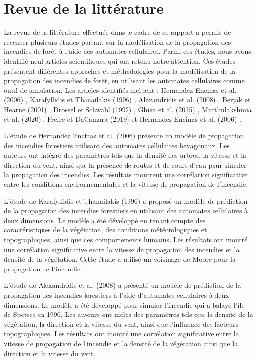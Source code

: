 \section{Revue de la littérature }

La revue de la littérature effectuée dans le cadre de ce rapport a permis de recenser plusieurs études portant sur la modélisation de la propagation des incendies de forêt à l'aide des automates cellulaires. Parmi ces études, nous avons identifié neuf articles scientifiques qui ont retenu notre attention. Ces études présentent différentes approches et méthodologies pour la modélisation de la propagation des incendies de forêt, en utilisant les automates cellulaires comme outil de simulation. Les articles identifiés incluent : Hernandez Encinas et al. (2006) \parencite{hernandez2006}, Karafyllidis et Thanailakis (1996) \parencite{ioannis1996}, Alexandridis et al. (2008) \parencite{alexandridis2008}, Berjak et Hearne (2001) \parencite{berjak2001}, Drossel et Schwabl (1992) \parencite{drossel1992}, Ghisu et al. (2015) \parencite{ghisu2015}, Mutthulakshmia et al. (2020) \parencite{mutthulakshmia2020}, Freire et DaCamara (2019) \parencite{freire2019} et Hernandez Encinas et al. (2006) \parencite{encinas2006}.

L'étude de Hernandez Encinas et al. (2006) \parencite{hernandez2006} présente un modèle de propagation des incendies forestiers utilisant des automates cellulaires hexagonaux. Les auteurs ont intégré des paramètres tels que la densité des arbres, la vitesse et la direction du vent, ainsi que la présence de routes et de cours d'eau pour simuler la propagation des incendies. Les résultats montrent une corrélation significative entre les conditions environnementales et la vitesse de propagation de l'incendie.

L'étude de Karafyllidis et Thanailakis (1996) \parencite{ioannis1996} a proposé un modèle de prédiction de la propagation des incendies forestiers en utilisant des automates cellulaires à deux dimensions. Le modèle a été développé en tenant compte des caractéristiques de la végétation, des conditions météorologiques et topographiques, ainsi que des comportements humains. Les résultats ont montré une corrélation significative entre la vitesse de propagation des incendies et la densité de la végétation. Cette étude a utilisé un voisinage de Moore pour la propagation de l'incendie.

L'étude de Alexandridis et al. (2008) \parencite{alexandridis2008} a présenté un modèle de prédiction de la propagation des incendies forestiers à l'aide d'automates cellulaires à deux dimensions. Le modèle a été développé pour simuler l'incendie qui a balayé l'île de Spetses en 1990. Les auteurs ont inclus des paramètres tels que la densité de la végétation, la direction et la vitesse du vent, ainsi que l'influence des facteurs topographiques. Les résultats ont montré une corrélation significative entre la vitesse de propagation de l'incendie et la densité de la végétation ainsi que la direction et la vitesse du vent.

